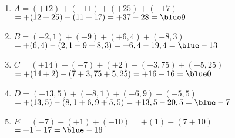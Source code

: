    \ \\ [-5mm]
   \begin{enumerate}
      \item $A =(+12) + (-11) + (+25) + (-17)$ \\
         \qquad\; $=+(12+25)-(11+17) =+37-28 =\blue 9$
      \item $B = (-2,1) + (-9) + (+6,4) + (-8,3)$ \\
         \quad $=+(6,4)-(2,1+9+8,3) =+6,4-19,4 =\blue -13$
      \item $C = (+14) + (-7) + (+2) + (-3,75) + (-5,25)$ \\
         \quad $=+(14+2)-(7+3,75+5,25) =+16-16 ={\blue 0}$
      \item $D = (+13,5) + (-8,1) + (-6,9) + (-5,5)$ \\
         $=+(13,5)-(8,1+6,9+5,5) =+13,5-20,5 =\blue -7$
      \item $E=(-7)+(+1)+(-10) =+(1)-(7+10)$ \\
        \qquad\; $=+1-17 =\blue -16$
   \end{enumerate}
